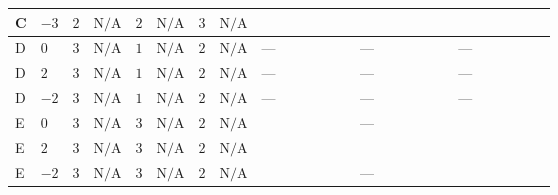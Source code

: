 \documentclass[8pt]{article}
\begin{document}
\begin{landscape}
\begin{longtable}{@{}llcccccc >{\raggedright\arraybackslash}p{0.21\linewidth} >{\raggedright\arraybackslash}p{0.21\linewidth} >{\raggedright\arraybackslash}p{0.21\linewidth}@{}}
C & $-3$ & $2$ & $\text{N/A}$ & $2$ & $\text{N/A}$ & $3$ & $\text{N/A}$ & \scriptsize\adjustbox{max width=\linewidth}{$\begin{gathered} \frac{4}{3} {\lambda_5} \left({\lambda_5}\right)^{*}\end{gathered}$} & \scriptsize\adjustbox{max width=\linewidth}{$\begin{gathered} +{g_1}^2 \left(18 {g_2}^2-15 {\lambda_{12}^{(A)}}\right)\end{gathered}$} & \scriptsize\adjustbox{max width=\linewidth}{$\begin{gathered} -9 {g_2}^2 {\lambda_{12}^{(A)}}\end{gathered}$} \\
\midrule
D & $0$ & $3$ & $\text{N/A}$ & $1$ & $\text{N/A}$ & $2$ & $\text{N/A}$ & --- & --- & --- \\
\midrule
D & $2$ & $3$ & $\text{N/A}$ & $1$ & $\text{N/A}$ & $2$ & $\text{N/A}$ & --- & --- & --- \\
\midrule
D & $-2$ & $3$ & $\text{N/A}$ & $1$ & $\text{N/A}$ & $2$ & $\text{N/A}$ & --- & --- & --- \\
\midrule
E & $0$ & $3$ & $\text{N/A}$ & $3$ & $\text{N/A}$ & $2$ & $\text{N/A}$ & \scriptsize\adjustbox{max width=\linewidth}{$\begin{gathered} -\frac{2}{9} {\lambda_5} \left({\lambda_5}\right)^{*}\end{gathered}$} & --- & \scriptsize\adjustbox{max width=\linewidth}{$\begin{gathered} -24 {g_2}^2 {\lambda_{12}^{(A)}}\end{gathered}$} \\
\midrule
E & $2$ & $3$ & $\text{N/A}$ & $3$ & $\text{N/A}$ & $2$ & $\text{N/A}$ & \scriptsize\adjustbox{max width=\linewidth}{$\begin{gathered} -\frac{2}{9} {\lambda_5} \left({\lambda_5}\right)^{*}\end{gathered}$} & \scriptsize\adjustbox{max width=\linewidth}{$\begin{gathered} +{g_1}^2 \left(16 {g_2}^2-30 {\lambda_{12}^{(A)}}\right)\end{gathered}$} & \scriptsize\adjustbox{max width=\linewidth}{$\begin{gathered} -24 {g_2}^2 {\lambda_{12}^{(A)}}\end{gathered}$} \\
\midrule
E & $-2$ & $3$ & $\text{N/A}$ & $3$ & $\text{N/A}$ & $2$ & $\text{N/A}$ & \scriptsize\adjustbox{max width=\linewidth}{$\begin{gathered} -\frac{2}{9} {\lambda_5} \left({\lambda_5}\right)^{*}\end{gathered}$} & --- & \scriptsize\adjustbox{max width=\linewidth}{$\begin{gathered} -24 {g_2}^2 {\lambda_{12}^{(A)}}\end{gathered}$} \\

\end{longtable}
\end{landscape}
\end{document}
